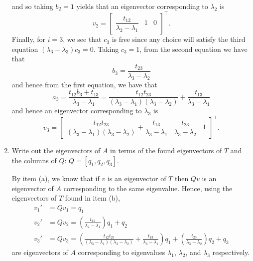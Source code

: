 \documentclass{../../../kin_math}
\begin{document}
\begin{questions}
\begin{enumerate}
\begin{solution}
\begin{equation*}
      \end{equation*}
      and so taking $b_2 = 1$ yields that an eigenvector corresponding to $\lambda_2$ is
      \begin{equation*}
        v_2 = \begin{bmatrix} \dfrac{t_{12}}{\lambda_2 - \lambda_1} & 1 & 0 \end{bmatrix}^\top.
      \end{equation*}
      Finally, for $i = 3$, we see that $c_3$ is free since any choice will satisfy the third equation $(\lambda_3 - \lambda_3)c_3 = 0$. Taking $c_3 = 1$, from the second equation we have that
      \begin{equation*}
        b_3 = \frac{t_{23}}{\lambda_3 - \lambda_2}
      \end{equation*}
      and hence from the first equation, we have that
      \begin{equation*}
        a_3 = \frac{t_{12}b_3 + t_{13}}{\lambda_3 - \lambda_1} = \frac{t_{12}t_{23}}{(\lambda_3 - \lambda_1)(\lambda_3 - \lambda_2)} + \frac{t_{13}}{\lambda_3 - \lambda_1}
      \end{equation*}
      and hence an eigenvector corresponding to $\lambda_3$ is
      \begin{equation*}
        v_3 = \begin{bmatrix} \dfrac{t_{12}t_{23}}{(\lambda_3 - \lambda_1)(\lambda_3 - \lambda_2)} + \dfrac{t_{13}}{\lambda_3 - \lambda_1} & \dfrac{t_{23}}{\lambda_3 - \lambda_2} & 1 \end{bmatrix}^\top.
      \end{equation*}
    \end{solution}
    \item Write out the eigenvectors of $A$ in terms of the found eigenvectors of $T$ and the columns of $Q$: $Q = [q_1, q_2, q_3]$.
    \begin{solution}
      By item (a), we know that if $v$ is an eigenvector of $T$ then $Qv$ is an eigenvector of $A$ corresponding to the same eigenvalue. Hence, using the eigenvectors of $T$ found in item (b),
      \begin{align*}
        v_1' &= Qv_1 = q_1 \\
        v_2' &= Qv_2 = \left(\frac{t_{12}}{\lambda_2 - \lambda_1}\right)q_1 + q_2 \\
        v_3' &= Qv_3 = \left(\frac{t_{12}t_{23}}{(\lambda_3 - \lambda_1)(\lambda_3 - \lambda_2)} + \frac{t_{13}}{\lambda_3 - \lambda_1}\right)q_1 + \left(\frac{t_{23}}{\lambda_3 - \lambda_2}\right)q_2 + q_3
      \end{align*}
      are eigenvectors of $A$ corresponding to eigenvalues $\lambda_1$, $\lambda_2$, and $\lambda_3$ respectively.
    \end{solution}
  \end{enumerate}


\end{questions}
\end{document}
